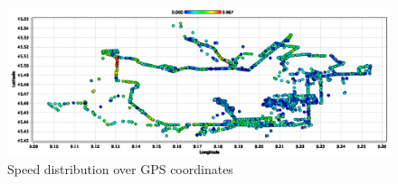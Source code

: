 \begin{figure}[t]
\centerline{\includegraphics[width=\textwidth]{images/5_speed_distrib.png}}
\caption{Speed distribution over GPS coordinates}
\label{figure:speeddistribGPS5}
\end{figure}
